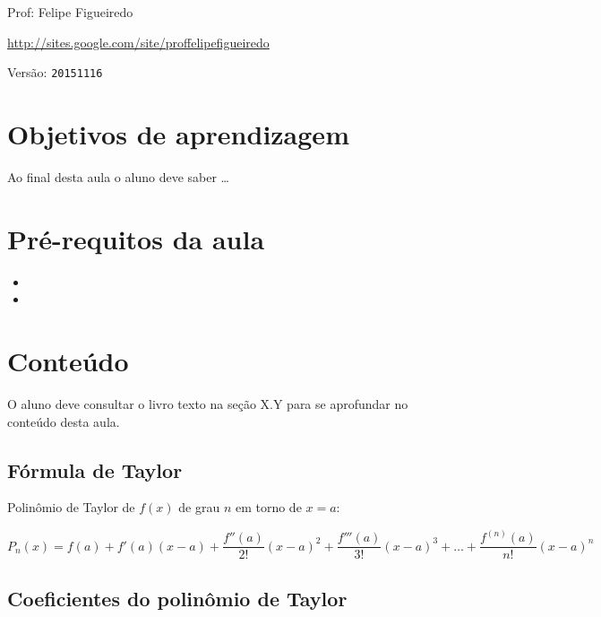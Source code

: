 \documentclass[a4paper]{article}
\begin{document}
\parbox[c]{.825\textwidth}{\raggedright%
{Prof: Felipe Figueiredo\par}
{\url{http://sites.google.com/site/proffelipefigueiredo}\par}
}

Versão: \verb|20151116|



\section{Objetivos de aprendizagem}

Ao final desta aula o aluno deve saber \ldots


\section{Pré-requitos da aula}

\begin{itemize}
\item 
\item 
\end{itemize}

\section{Conteúdo}

O aluno deve consultar o livro texto na seção X.Y para se aprofundar
no conteúdo desta aula.

\subsection{Fórmula de Taylor}

Polinômio de Taylor de $f(x)$ de grau $n$ em torno de $x=a$:

\begin{displaymath}
P_n(x) = f(a) + f'(a)(x-a) + \frac{f''(a)}{2!}(x-a)^2 + \frac{f'''(a)}{3!}(x-a)^3 + \ldots + \frac{f^{(n)}(a)}{n!}(x-a)^n
\end{displaymath}

\subsection{Coeficientes do polinômio de Taylor}
\end{document}
